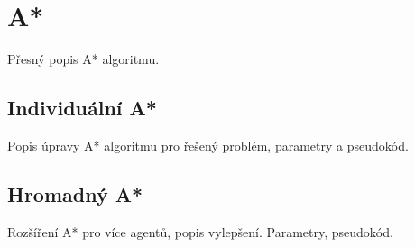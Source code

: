 \section{A*}\label{sec:a_star}

Přesný popis A* algoritmu.

\subsection{Individuální A*}\label{subsec:individualni_a_star}
Popis úpravy A* algoritmu pro řešený problém, parametry a pseudokód.

\subsection{Hromadný A*}\label{subsec:hromadny_a_star}

Rozšíření A* pro více agentů, popis vylepšení.
Parametry, pseudokód.



